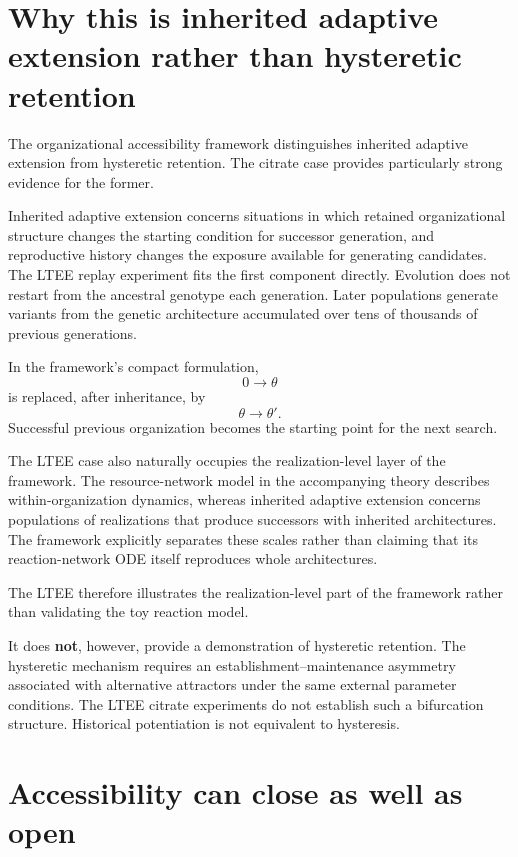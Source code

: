 \documentclass[11pt]{article}
\begin{document}
\section{Why this is inherited adaptive extension rather than hysteretic retention}

The organizational accessibility framework distinguishes inherited adaptive extension from hysteretic retention. The citrate case provides particularly strong evidence for the former.

Inherited adaptive extension concerns situations in which retained organizational structure changes the starting condition for successor generation, and reproductive history changes the exposure available for generating candidates. The LTEE replay experiment fits the first component directly. Evolution does not restart from the ancestral genotype each generation. Later populations generate variants from the genetic architecture accumulated over tens of thousands of previous generations.

In the framework's compact formulation,
\[
0\longrightarrow\theta
\]
is replaced, after inheritance, by
\[
\theta\longrightarrow\theta'.
\]
Successful previous organization becomes the starting point for the next search.

The LTEE case also naturally occupies the realization-level layer of the framework. The resource-network model in the accompanying theory describes within-organization dynamics, whereas inherited adaptive extension concerns populations of realizations that produce successors with inherited architectures. The framework explicitly separates these scales rather than claiming that its reaction-network ODE itself reproduces whole architectures.

The LTEE therefore illustrates the realization-level part of the framework rather than validating the toy reaction model.

It does \textbf{not}, however, provide a demonstration of hysteretic retention. The hysteretic mechanism requires an establishment--maintenance asymmetry associated with alternative attractors under the same external parameter conditions. The LTEE citrate experiments do not establish such a bifurcation structure. Historical potentiation is not equivalent to hysteresis.

\section{Accessibility can close as well as open}
\end{document}

